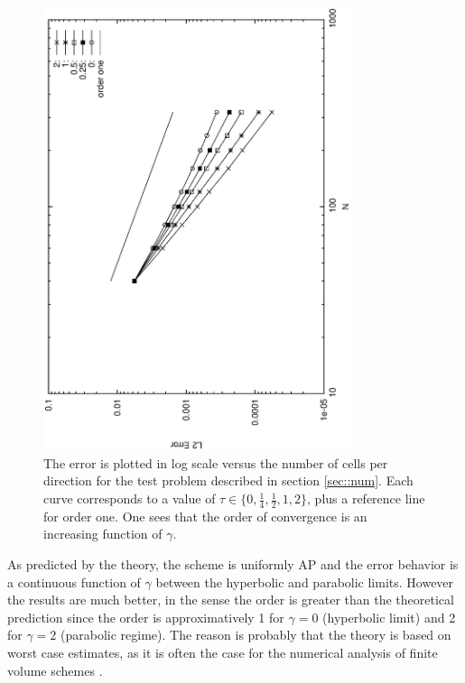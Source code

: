 \documentclass[a4paper,french,english,10pt]{article}
\begin{document}
\begin{figure}
\begin{center}
\includegraphics[width=9cm,angle=-90]{sortie_enfin.eps}
\end{center}
\caption{The error is plotted in log scale versus the number of cells per direction for the test problem described
in section \ref{sec::num}.
Each curve corresponds to a value of $\tau\in\{0,\frac14, \frac12, 1, 2  \}$, plus 
a reference line for order one. One sees that the order of convergence is an increasing function
of $\gamma$.}
\label{fig1}
\end{figure}

As predicted by  the theory, the scheme is uniformly AP and the error behavior is a continuous function of $\gamma$
between the  hyperbolic and parabolic limits. However the results are much better, in the sense
the order is greater than the theoretical prediction since
the order is approximatively 1 for $\gamma=0$ (hyperbolic limit)
and 2 for $\gamma=2$ (parabolic regime).
The reason is probably that the theory is based on worst case estimates, as it is often the case for the numerical analysis
of finite volume schemes \cite{FV}.


\end{document}
